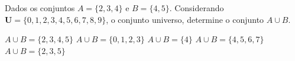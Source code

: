 \noindent\parbox{\linewidth}{

Dados os conjuntos $A=\{2,3,4\}$ e $B=\{4,5\}$. Considerando $\mathbf{U}=\{0,1,2,3,4,5,6,7,8,9\}$, o conjunto universo, determine o conjunto $A\cup B$.

$A\cup B=\{2,3,4,5\}$
$A\cup B=\{0,1,2,3\}$
$A\cup B=\{4\}$
$A\cup B=\{4,5,6,7\}$
$A\cup B=\{2,3,5\}$




}


